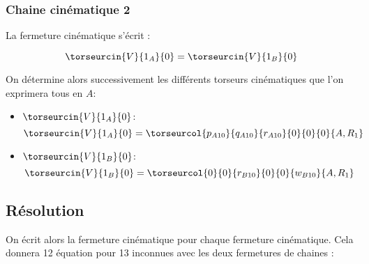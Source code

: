 \subsubsection*{Chaine cinématique 2}
La fermeture cinématique s'écrit :

		$$\torseurcin{V}{1_A}{0}=	\torseurcin{V}{1_B}{0}$$
		
		On détermine alors successivement les différents torseurs cinématiques que l'on exprimera tous en $A$:

		\begin{itemize}
\item \textbf{$\torseurcin{V}{1_A}{0}$}:\\
$$
\torseurcin{V}{1_A}{0}	
=	\torseurcol{p_{A10}}{q_{A10}}{r_{A10}}{0}{0}{0}{A,R_{1}}
$$
\item \textbf{$\torseurcin{V}{1_B}{0}$}:\\
$$
\torseurcin{V}{1_B}{0}
=	\torseurcol{0}{0}{r_{B10}}{0}{0}{w_{B10}}{A,R_{1}}
$$

\end{itemize}



\subsection*{Résolution}
On écrit alors la fermeture cinématique pour chaque fermeture cinématique. Cela donnera 12 équation pour 13 inconnues avec les deux fermetures de chaines :


